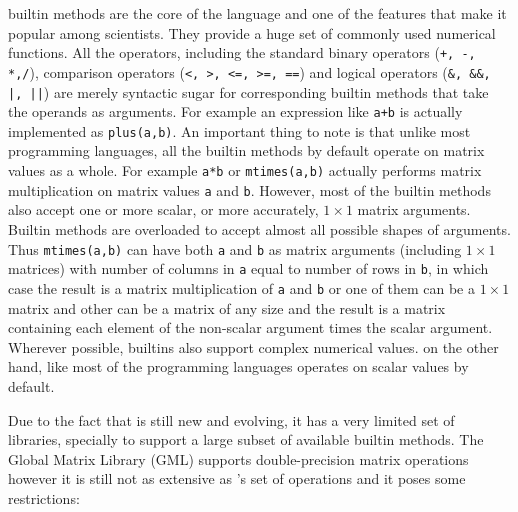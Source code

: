 \matlab  builtin methods are the core of the language and one of the
features that make it popular among scientists. They provide a huge set
of commonly used numerical functions.  All the operators, including the
standard binary operators (\verb|+, -, *,/|), comparison operators
(\verb|<, >, <=, >=, ==|) and logical operators (\verb+&, &&, |, ||+)
are merely syntactic sugar for corresponding builtin methods that take
the operands as arguments. For example an expression like \verb|a+b| is
actually implemented as \verb|plus(a,b)|. An important thing to note is
that unlike most programming languages, all the \matlab builtin methods
by default operate on matrix values as a whole. For example \verb|a*b|
or \verb|mtimes(a,b)| actually performs matrix multiplication on matrix
values \verb|a| and \verb|b|.  However, most of the builtin methods also
accept one or more scalar, or more accurately, $1\times1$ matrix
arguments.
Builtin methods are overloaded to accept almost all possible shapes of
arguments. Thus \verb|mtimes(a,b)| can have both \verb|a| and \verb|b| as
matrix arguments (including $1\times1$ matrices) with number of columns in
\verb|a| equal to number of rows in \verb|b|, in which case the result
is a matrix multiplication of \verb|a| and \verb|b| or one of them can
be a $1\times1$ matrix and other can be a matrix of any size and the
result is a matrix containing each element of the non-scalar argument
times the scalar argument.  Wherever possible, \matlab builtins also
support complex numerical values.  \xten on the other hand, like most of
the programming languages operates on scalar values by default.
 
Due to the fact that \xten is still new and evolving, it has a very
limited set of libraries, specially to support a large subset of
available \matlab builtin methods. The \xten Global Matrix Library (GML)
supports double-precision matrix operations however it is still not as
extensive as \matlab's set of operations and it poses some restrictions:

